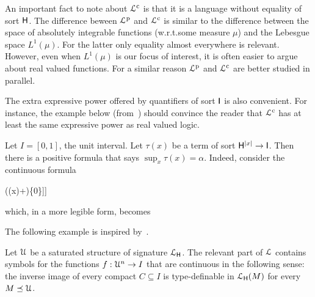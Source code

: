 \documentclass{amsproc}
\def\dotminus{\stackon[.2ex]{$-$}{$.$}}
\begin{document}
An important fact to note about ${\EuScript L}^{\rm c}$ is that it is a language without equality of sort ${\sf H}$.
The difference beween ${\EuScript L}^{\rm p}$ and ${\EuScript L}^{\rm c}$ is similar to the difference between the space of absolutely integrable functions (w.r.t.\@ some measure $\mu$) and the Lebesgue space $L^1(\mu)$.
For the latter only equality almost everywhere is relevant.
However, even when $L^1(\mu)$ is our focus of interest, it is often easier to argue about real valued functions.
For a similar reason ${\EuScript L}^{\rm p}$ and ${\EuScript L}^{\rm c}$ are better studied in parallel.

The extra expressive power offered by quantifiers of sort ${\sf I}$ is also convenient.
For instance, the example below (from~\cite{clcl}) should convince the reader that ${\EuScript L}^{\rm c}$ has at least the same expressive power as real valued logic.%

\begin{example}\label{ex_Rvlogic}
  Let $I=[0,1]$, the unit interval.
  Let $\tau(x)$ be a term of sort ${\sf H}^{|x|}\to {\sf I}$.
  Then there is a positive formula that says $\sup_x \tau(x)=\alpha$.
  Indeed, consider the continuous formula

  \ceq{\hfill\forall x\ \big[\tau(x)\dotminus\alpha\in\{0\}\big]}
  {\wedge}{\forall \varepsilon \Big[\varepsilon\in\{0\}\ \vee\ \exists x\ \big[\alpha\dotminus (\tau(x)+\varepsilon)\in\{0\}\big]\Big]}

  which, in a more legible form, becomes

\end{example}

The following example is inspired by~\cite{HPP}.

\begin{example}\label{ex_HPP}
  Let ${\EuScript U}$ be a saturated structure of signature ${\EuScript L}_{\sf H}$.
  The relevant part of ${\EuScript L}$ contains symbols for the functions $f:{\EuScript U}^n\to I$ that are continuous in the following sense: the inverse image of every compact $C\subseteq I$ is type-definable in ${\EuScript L}_{\sf H}(M)$ for every $M\preceq{\EuScript U}$.
\end{example}
\end{document}
